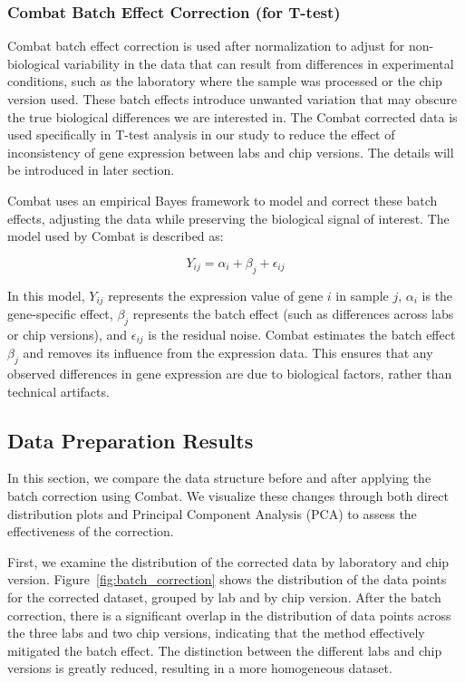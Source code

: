 \documentclass[12pt]{article}
\begin{document}
\subsubsection{Combat Batch Effect Correction (for T-test)}

Combat batch effect correction is used after normalization to adjust for non-biological variability in the data that can result from differences in experimental conditions, such as the laboratory where the sample was processed or the chip version used. These batch effects introduce unwanted variation that may obscure the true biological differences we are interested in.  The Combat corrected data is used specifically in T-test analysis in our study to reduce the effect of inconsistency of gene expression between labs and chip versions. The details will be introduced in later section.

Combat uses an empirical Bayes framework to model and correct these batch effects, adjusting the data while preserving the biological signal of interest. The model used by Combat is described as:

\[
Y_{ij} = \alpha_i + \beta_j + \epsilon_{ij}
\]

In this model, $Y_{ij}$ represents the expression value of gene $i$ in sample $j$, $\alpha_i$ is the gene-specific effect, $\beta_j$ represents the batch effect (such as differences across labs or chip versions), and $\epsilon_{ij}$ is the residual noise. Combat estimates the batch effect $\beta_j$ and removes its influence from the expression data. This ensures that any observed differences in gene expression are due to biological factors, rather than technical artifacts.

\subsection{Data Preparation Results}

In this section, we compare the data structure before and after applying the batch correction using Combat. We visualize these changes through both direct distribution plots and Principal Component Analysis (PCA) to assess the effectiveness of the correction.

First, we examine the distribution of the corrected data by laboratory and chip version. Figure~\ref{fig:batch_correction} shows the distribution of the data points for the corrected dataset, grouped by lab and by chip version. After the batch correction, there is a significant overlap in the distribution of data points across the three labs and two chip versions, indicating that the method effectively mitigated the batch effect. The distinction between the different labs and chip versions is greatly reduced, resulting in a more homogeneous dataset.
\end{document}
